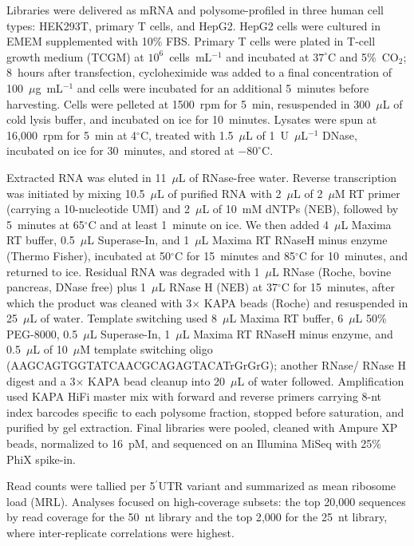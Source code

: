 \documentclass[11pt]{article}
\begin{document}
Libraries were delivered as mRNA and polysome-profiled in three human cell
types: HEK293T, primary T cells, and HepG2. HepG2 cells were cultured in
EMEM supplemented with 10\% FBS. Primary T cells were plated in T-cell
growth medium (TCGM) at $10^{6}$~cells~mL$^{-1}$ and incubated at
$37^\circ$C and 5\%~CO$_2$; 8~hours after transfection, cycloheximide was
added to a final concentration of 100~$\mu$g~mL$^{-1}$ and cells were
incubated for an additional 5~minutes before harvesting. Cells were
pelleted at 1500~rpm for 5~min, resuspended in 300~$\mu$L of cold lysis
buffer, and incubated on ice for 10~minutes. Lysates were spun at
16{,}000~rpm for 5~min at 4$^\circ$C, treated with 1.5~$\mu$L of
1~U~$\mu$L$^{-1}$ DNase, incubated on ice for 30~minutes, and stored at
$-80^\circ$C.

Extracted RNA was eluted in 11~$\mu$L of RNase-free water. Reverse
transcription was initiated by mixing 10.5~$\mu$L of purified RNA with
2~$\mu$L of 2~$\mu$M RT primer (carrying a 10-nucleotide UMI) and
2~$\mu$L of 10~mM dNTPs (NEB), followed by 5~minutes at 65$^\circ$C and
at least 1~minute on ice. We then added 4~$\mu$L Maxima RT buffer,
0.5~$\mu$L Superase-In, and 1~$\mu$L Maxima RT RNaseH minus enzyme
(Thermo Fisher), incubated at 50$^\circ$C for 15~minutes and
85$^\circ$C for 10~minutes, and returned to ice. Residual RNA was
degraded with 1~$\mu$L RNase (Roche, bovine pancreas, DNase free) plus
1~$\mu$L RNase H (NEB) at 37$^\circ$C for 15~minutes, after which the
product was cleaned with 3$\times$ KAPA beads (Roche) and resuspended
in 25~$\mu$L of water. Template switching used 8~$\mu$L Maxima RT
buffer, 6~$\mu$L 50\% PEG-8000, 0.5~$\mu$L Superase-In, 1~$\mu$L
Maxima RT RNaseH minus enzyme, and 0.5~$\mu$L of 10~$\mu$M template
switching oligo (AAGCAGTGGTATCAACGCAGAGTACATrGrGrG); another RNase/
RNase H digest and a 3$\times$ KAPA bead cleanup into 20~$\mu$L of
water followed. Amplification used KAPA HiFi master mix with forward
and reverse primers carrying 8-nt index barcodes specific to each
polysome fraction, stopped before saturation, and purified by gel
extraction. Final libraries were pooled, cleaned with Ampure XP beads,
normalized to 16~pM, and sequenced on an Illumina MiSeq with
25\% PhiX spike-in.

Read counts were tallied per 5$^\prime$UTR variant and summarized as
mean ribosome load (MRL). Analyses focused on high-coverage subsets:
the top 20{,}000 sequences by read coverage for the 50~nt library and
the top 2{,}000 for the 25~nt library, where inter-replicate
correlations were highest.
\end{document}
